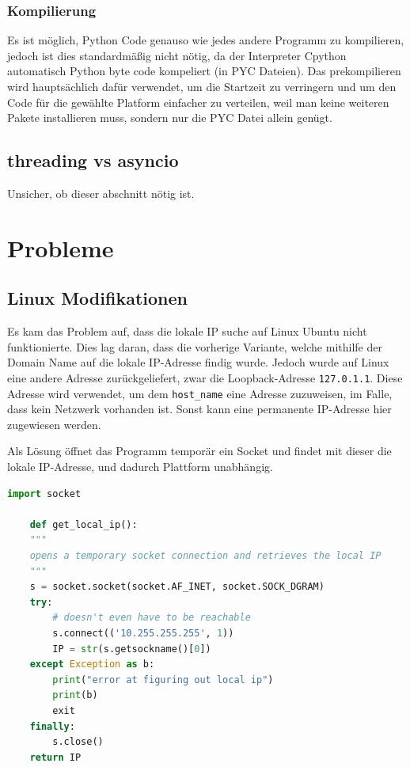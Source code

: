 \subsubsection{Kompilierung}
Es ist möglich, Python Code genauso wie jedes andere Programm zu kompilieren,
jedoch ist dies standardmäßig nicht nötig, 
da der Interpreter Cpython automatisch Python byte code kompeliert (in PYC Dateien).
Das prekompilieren wird hauptsächlich dafür verwendet, um die Startzeit zu verringern 
und um den Code für die gewählte Platform einfacher zu verteilen,
weil man keine weiteren Pakete installieren muss, 
sondern nur die PYC Datei allein genügt.

\subsection{threading vs asyncio}
Unsicher, ob dieser abschnitt nötig ist.

\section{Probleme}
\subsection{Linux Modifikationen}
Es kam das Problem auf, dass die lokale IP suche auf Linux Ubuntu nicht funktionierte.
Dies lag daran, dass die vorherige Variante, 
welche mithilfe der Domain Name auf die lokale IP-Adresse findig wurde.
Jedoch wurde auf Linux eine andere Adresse zurückgeliefert, 
zwar die Loopback-Adresse \texttt{127.0.1.1}. 
Diese Adresse wird verwendet, um dem \texttt{host\_name} eine Adresse zuzuweisen,
im Falle, dass kein Netzwerk vorhanden ist. 
Sonst kann eine permanente IP-Adresse hier zugewiesen werden.

Als Lösung öffnet das Programm temporär ein Socket 
und findet mit dieser die lokale IP-Adresse, und dadurch Plattform unabhängig.
\begin{lstlisting}[language=python, gobble=4]
    import socket

    def get_local_ip():
    """
    opens a temporary socket connection and retrieves the local IP
    """
    s = socket.socket(socket.AF_INET, socket.SOCK_DGRAM)
    try:
        # doesn't even have to be reachable
        s.connect(('10.255.255.255', 1))
        IP = str(s.getsockname()[0])
    except Exception as b:
        print("error at figuring out local ip")
        print(b)
        exit
    finally:
        s.close()
    return IP
\end{lstlisting}


